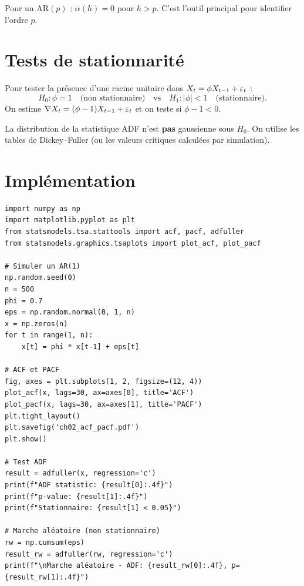 \begin{theoreme}
Pour un AR$(p)$ : $\alpha(h)=0$ pour $h>p$. C'est l'outil principal pour identifier l'ordre $p$.
\end{theoreme}

\section{Tests de stationnarit\'e}

\begin{definition}
Pour tester la pr\'esence d'une racine unitaire dans $X_t = \phi X_{t-1}+\varepsilon_t$ :
\[
H_0 : \phi=1 \quad\text{(non stationnaire)} \quad \text{vs} \quad H_1 : |\phi|<1 \quad\text{(stationnaire)}.
\]
On estime $\nabla X_t = (\phi-1)X_{t-1}+\varepsilon_t$ et on teste si $\phi-1<0$.
\end{definition}

\begin{attention}
La distribution de la statistique ADF n'est \textbf{pas} gaussienne sous $H_0$. On utilise les tables de Dickey--Fuller (ou les valeurs critiques calcul\'ees par simulation).
\end{attention}

\section{Impl\'ementation}

\begin{codeblock}[title=\textbf{Python}]
\begin{verbatim}
import numpy as np
import matplotlib.pyplot as plt
from statsmodels.tsa.stattools import acf, pacf, adfuller
from statsmodels.graphics.tsaplots import plot_acf, plot_pacf

# Simuler un AR(1)
np.random.seed(0)
n = 500
phi = 0.7
eps = np.random.normal(0, 1, n)
x = np.zeros(n)
for t in range(1, n):
    x[t] = phi * x[t-1] + eps[t]

# ACF et PACF
fig, axes = plt.subplots(1, 2, figsize=(12, 4))
plot_acf(x, lags=30, ax=axes[0], title='ACF')
plot_pacf(x, lags=30, ax=axes[1], title='PACF')
plt.tight_layout()
plt.savefig('ch02_acf_pacf.pdf')
plt.show()

# Test ADF
result = adfuller(x, regression='c')
print(f"ADF statistic: {result[0]:.4f}")
print(f"p-value: {result[1]:.4f}")
print(f"Stationnaire: {result[1] < 0.05}")

# Marche aléatoire (non stationnaire)
rw = np.cumsum(eps)
result_rw = adfuller(rw, regression='c')
print(f"\nMarche aléatoire - ADF: {result_rw[0]:.4f}, p={result_rw[1]:.4f}")
\end{verbatim}
\end{codeblock}

